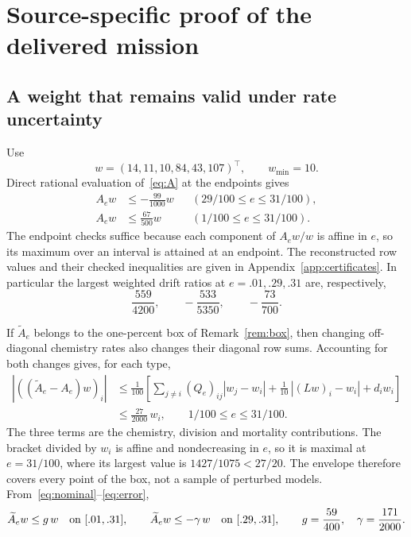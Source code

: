 \section{Source-specific proof of the delivered mission}\label{sec:proof}
\subsection{A weight that remains valid under rate uncertainty}
Use
\begin{equation}\label{eq:w}
 w=(14,11,10,84,43,107)^\top,\qquad w_{\min}=10.
\end{equation}
Direct rational evaluation of~\eqref{eq:A} at the endpoints gives
\begin{align}\label{eq:nominal}
 A_ew&\le-\frac{99}{1000}w &&(29/100\le e\le31/100),\nonumber\\
 A_ew&\le\frac{67}{500}w &&(1/100\le e\le31/100).
\end{align}
The endpoint checks suffice because each component of $A_ew/w$ is affine in $e$, so its maximum over an interval is attained at an endpoint. The reconstructed row values and their checked inequalities are given in Appendix~\ref{app:certificates}. In particular the largest weighted drift ratios at $e=.01,.29,.31$ are, respectively,
\[
 \frac{559}{4200},\qquad-\frac{533}{5350},\qquad-\frac{73}{700}.
\]

If $\widetilde A_e$ belongs to the one-percent box of Remark~\ref{rem:box}, then changing off-diagonal chemistry rates also changes their diagonal row sums. Accounting for both changes gives, for each type,
\begin{align}\label{eq:error}
 |((\widetilde A_e-A_e)w)_i|
 &\le\frac1{100}\left[
 \sum_{j\ne i}(Q_e)_{ij}|w_j-w_i|
 +\frac1{10}\,|(Lw)_i-w_i|+d_iw_i\right]\nonumber\\
 &\le\frac{27}{2000}\,w_i,\qquad 1/100\le e\le31/100.
\end{align}
The three terms are the chemistry, division and mortality contributions. The bracket divided by $w_i$ is affine and nondecreasing in $e$, so it is maximal at $e=31/100$, where its largest value is $1427/1075<27/20$. The envelope therefore covers every point of the box, not a sample of perturbed models. From~\eqref{eq:nominal}--\eqref{eq:error},
\begin{equation}\label{eq:robustdrift}
 \widetilde A_ew\le g\,w\quad\hbox{on }[.01,.31],\qquad
 \widetilde A_ew\le-\gamma\,w\quad\hbox{on }[.29,.31],\qquad
 g=\frac{59}{400},\quad\gamma=\frac{171}{2000}.
\end{equation}

